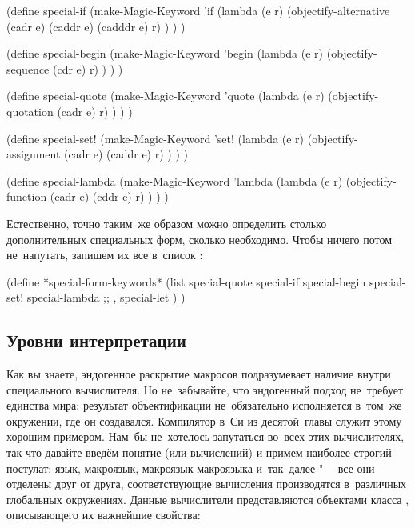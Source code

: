 \begin{code:lisp}
(define special-if
  (make-Magic-Keyword 'if
    (lambda (e r)
      (objectify-alternative (cadr e) (caddr e) (cadddr e) r) ) ) )

(define special-begin
  (make-Magic-Keyword 'begin
    (lambda (e r)
      (objectify-sequence (cdr e) r) ) ) )

(define special-quote
  (make-Magic-Keyword 'quote
    (lambda (e r)
      (objectify-quotation (cadr e) r) ) ) )

(define special-set!
  (make-Magic-Keyword 'set!
    (lambda (e r)
      (objectify-assignment (cadr e) (caddr e) r) ) ) )

(define special-lambda
  (make-Magic-Keyword 'lambda
    (lambda (e r)
      (objectify-function (cadr e) (cddr e) r) ) ) )
\end{code:lisp}

Естественно, точно таким~же образом можно определить столько дополнительных
специальных форм, сколько необходимо. Чтобы ничего потом не~напутать, запишем
их все в~список :

\begin{code:lisp}
(define *special-form-keywords*
  (list special-quote
        special-if
        special-begin
        special-set!
        special-lambda
        ;; ,  {\itd}
        special-let
        ) )
\end{code:lisp}


\subsection{Уровни интерпретации}\label{macros/macrosystem/ssect:eval-level}

Как вы знаете, эндогенное раскрытие макросов подразумевает наличие внутри
специального вычислителя. Но не~забывайте, что эндогенный подход не~требует
единства мира: результат объектификации не~обязательно исполняется в~том~же
окружении, где он создавался. Компилятор в~Си из десятой~главы
\seePage[chapter:cc] служит этому хорошим примером. Нам~бы не~хотелось
запутаться во~всех этих вычислителях, так что давайте введём понятие
 (или вычислений) и примем наиболее строгий постулат:
язык, макроязык, макроязык макроязыка и~так~далее "--- все они отделены друг от
друга, соответствующие вычисления производятся в~различных глобальных
окружениях. Данные вычислители представляются объектами класса ,
описывающего их важнейшие свойства:

